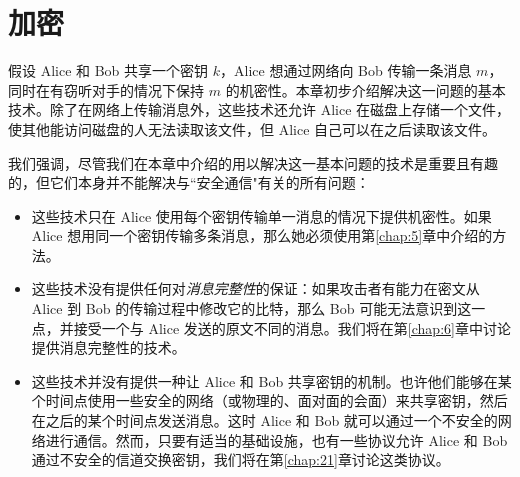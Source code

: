 \chapter{加密}

假设 Alice 和 Bob 共享一个密钥 $k$，Alice 想通过网络向 Bob 传输一条消息 $m$，同时在有窃听对手的情况下保持 $m$ 的机密性。本章初步介绍解决这一问题的基本技术。除了在网络上传输消息外，这些技术还允许 Alice 在磁盘上存储一个文件，使其他能访问磁盘的人无法读取该文件，但 Alice 自己可以在之后读取该文件。

我们强调，尽管我们在本章中介绍的用以解决这一基本问题的技术是重要且有趣的，但它们本身并不能解决与``安全通信"有关的所有问题：
\begin{itemize}
	\item 这些技术只在 Alice 使用每个密钥传输单一消息的情况下提供机密性。如果 Alice 想用同一个密钥传输多条消息，那么她必须使用第\ref{chap:5}章中介绍的方法。
	\item 这些技术没有提供任何对\emph{消息完整性}的保证：如果攻击者有能力在密文从 Alice 到 Bob 的传输过程中修改它的比特，那么 Bob 可能无法意识到这一点，并接受一个与 Alice 发送的原文不同的消息。我们将在第\ref{chap:6}章中讨论提供消息完整性的技术。
	\item 这些技术并没有提供一种让 Alice 和 Bob 共享密钥的机制。也许他们能够在某个时间点使用一些安全的网络（或物理的、面对面的会面）来共享密钥，然后在之后的某个时间点发送消息。这时 Alice 和 Bob 就可以通过一个不安全的网络进行通信。然而，只要有适当的基础设施，也有一些协议允许 Alice 和 Bob 通过不安全的信道交换密钥，我们将在第\ref{chap:21}章讨论这类协议。
\end{itemize}






